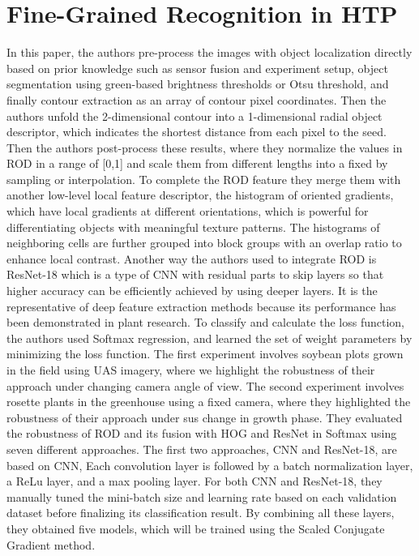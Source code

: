 \section{Fine-Grained Recognition in HTP}
In this paper, the authors pre-process the images with object localization directly based on prior knowledge such as sensor fusion and experiment setup,
object segmentation using green-based brightness thresholds or Otsu threshold, and finally contour extraction as an array of contour pixel coordinates.
Then the authors unfold the 2-dimensional contour into a 1-dimensional radial object descriptor, which indicates the shortest distance from each pixel to the seed.
Then the authors post-process these results, where they normalize the values in ROD in a range of [0,1] and scale them from different lengths into a fixed
by sampling or interpolation. To complete the ROD feature they merge them with another low-level local feature descriptor, the histogram of oriented gradients,
which have local gradients at different orientations, which is powerful for differentiating objects with meaningful texture patterns. The histograms of neighboring
cells are further grouped into block groups with an overlap ratio to enhance local contrast. Another way the authors used to integrate ROD is ResNet-18 which is a
type of CNN with residual parts to skip layers so that higher accuracy can be efficiently achieved by using deeper layers. It is the representative of deep feature
extraction methods because its performance has been demonstrated in plant research. To classify and calculate the loss function, the authors used Softmax regression,
and learned the set of weight parameters by minimizing the loss function. The first experiment involves soybean plots grown in the field using UAS imagery, where we
highlight the robustness of their approach under changing camera angle of view. The second experiment involves rosette plants in the greenhouse using a fixed camera,
where they highlighted the robustness of their approach under sus change in growth phase. They evaluated the robustness of ROD and its fusion with HOG and ResNet in
Softmax using seven different approaches. The first two approaches, CNN and ResNet-18, are based on CNN, Each convolution layer is followed by a batch normalization
layer, a ReLu layer, and a max pooling layer. For both CNN and ResNet-18, they manually tuned the mini-batch size and learning rate based on each validation dataset
before finalizing its classification result. By combining all these layers, they obtained five models, which will be trained using the Scaled Conjugate Gradient method.
